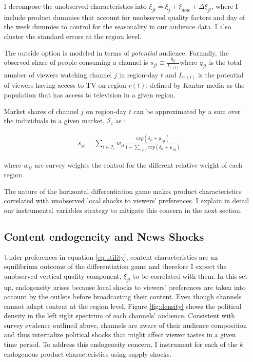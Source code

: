 \documentclass[12pt]{article}
\begin{document}
	I decompose the unobserved characteristics into $\xi_{jt}= \xi_j + \xi_{dow} + \Delta \xi_{jt}$, where I include product dummies that account for unobserved quality factors and day of the week dummies to control for the seasonality in our audience data. I also cluster the standard errors at the region level. 
	
	The outside option is modeled in terms of \textit{potential} audience. Formally, the observed share of people consuming a channel  is $ s_{jt}\equiv \frac{q_{jt}}{L_{r(t)}}$where $ q_{jt} $ is the total number of viewers watching channel $ j $ in region-day $ t $ and  $ L_{r(t)} $ is the potential of viewers having access to TV on region $ r(t) $; defined by Kantar media as the population that has access to television in a given region. 
	
	Market shares of channel $j$ on region-day $t$ can be approximated by a sum over the individuals in a given market, $\mathcal{I}_t$ as : 
	
	
	\begin{equation}\label{eq:shares}
		\begin{aligned}
			& s_{jt} = \sum_{i \in \mathcal{I}_t} w_{it} \frac{exp(\delta_{jt} + \mu_{ijt})}{ 1+ \sum_{l\neq j } exp(\delta_{lt} + \mu_{ilt}) } 
		\end{aligned}
	\end{equation} 
	
	
	where $w_{it}$ are survey weights the control for the different relative weight of each region. 
	
	
	
	The nature of the horizontal differentiation game makes product characteristics correlated with unobserved local shocks to viewers' preferences.  I explain in detail our instrumental variables strategy to mitigate this concern in the next section. 
	
	
	
	\subsection{Content endogeneity and News Shocks} \label{section:endogeneity}
	
	
	Under preferences in equation \ref{eq:utility}, content characteristics are an equilibrium outcome of the differentiation game and therefore I expect the  unobserved vertical quality component, $ \xi_{jt} $ to be correlated with them. In this set up, endogeneity arises because local shocks to viewers' preferences are taken into account by the outlets before broadcasting their content. Even though channels cannot adapt content at the region level, Figure \ref{fig:density} shows the political density in the left right spectrum of each channels' audience. Consistent with survey evidence outlined above, channels are aware of their audience composition  and thus internalize political shocks that might affect viewer tastes in a given time period. To address this endogeneity concern, I instrument for each of the $ k $ endogenous product characteristics using supply shocks. 
	
\end{document}
